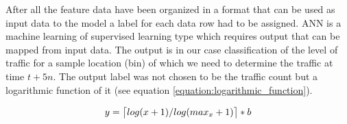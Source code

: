 \documentclass[12pt, a4paper]{report}
\DeclarePairedDelimiter{\ceil}{\lceil}{\rceil}
\theoremstyle{definition}
\theoremstyle{definition}%
\theoremstyle{definition}%
\theoremstyle{definition}%
\theoremstyle{definition}%
\theoremstyle{definition}%
\begin{document}
\begin{table}[h]	
	\centering
	\caption{Sparse traffic flow matrix} 
	\label{table:dataset_03}
\end{table}

After all the feature data have been organized in a format that can be used as input data to the model a label for each data row had to be assigned. ANN is a machine learning of supervised learning type which requires output that can be mapped from input data. The output is in our case classification of the level of traffic for a sample location (bin) of which we need to determine the traffic at time $t + 5n$. The output label was not chosen to be the traffic count but a logarithmic function of it (see equation \ref{equation:logarithmic_function}).

\begin{equation} \label{equation:logarithmic_function}
y=\ceil[\big]{log(x+1)/log(max_x + 1)} * b \\
\end{equation}
\end{document}
